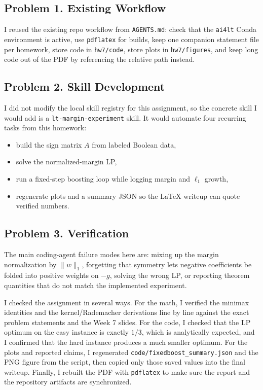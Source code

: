 \documentclass{article}
\begin{document}
\subsection{Problem 1. Existing Workflow}

I reused the existing repo workflow from \verb|AGENTS.md|: check that the \verb|ai4lt| Conda environment is active, use \verb|pdflatex| for builds, keep one companion statement file per homework, store code in \verb|hw7/code|, store plots in \verb|hw7/figures|, and keep long code out of the PDF by referencing the relative path instead.

\subsection{Problem 2. Skill Development}

I did not modify the local skill registry for this assignment, so the concrete skill I would add is a \verb|lt-margin-experiment| skill. It would automate four recurring tasks from this homework:
\begin{itemize}
\item build the sign matrix $A$ from labeled Boolean data,
\item solve the normalized-margin LP,
\item run a fixed-step boosting loop while logging margin and $\ell_1$ growth,
\item regenerate plots and a summary JSON so the LaTeX writeup can quote verified numbers.
\end{itemize}

\subsection{Problem 3. Verification}

The main coding-agent failure modes here are: mixing up the margin normalization by $\|w\|_1$, forgetting that symmetry lets negative coefficients be folded into positive weights on $-g$, solving the wrong LP, or reporting theorem quantities that do not match the implemented experiment.

I checked the assignment in several ways. For the math, I verified the minimax identities and the kernel/Rademacher derivations line by line against the exact problem statements and the Week 7 slides. For the code, I checked that the LP optimum on the easy instance is exactly $1/3$, which is analytically expected, and I confirmed that the hard instance produces a much smaller optimum. For the plots and reported claims, I regenerated \verb|code/fixedboost_summary.json| and the PNG figure from the script, then copied only those saved values into the final writeup. Finally, I rebuilt the PDF with \verb|pdflatex| to make sure the report and the repository artifacts are synchronized.
\end{document}
